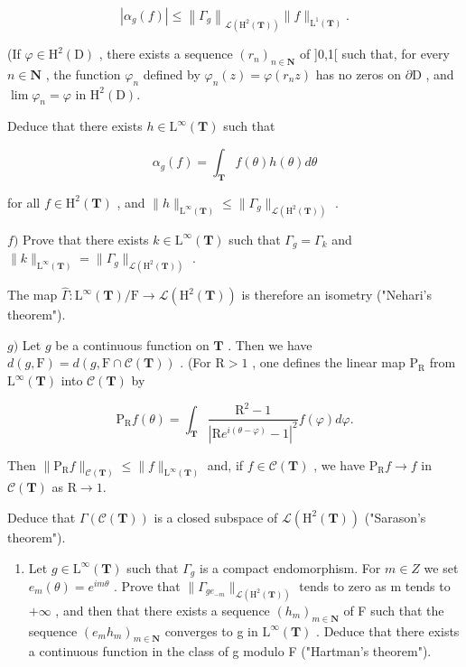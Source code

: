 \[
\left| \alpha_ {g} (f) \right| \leqslant \left\| \Gamma_ {g} \right\| _ {\mathscr {L} \left(\mathrm{H} ^ {2} (\mathbf {T})\right)} \| f \| _ {\mathrm{L} ^ {1} (\mathbf {T})}.
\]

(If \(\varphi \in \mathrm{H}^2 (\mathrm{D})\) , there exists a sequence \((r_n)_{n\in \mathbf{N}}\) of ]0,1[ such that, for every \(n\in \mathbf{N}\) , the function \(\varphi_{n}\) defined by \(\varphi_{n}(z) = \varphi (r_{n}z)\) has no zeros on \(\partial \mathrm{D}\) , and \(\lim \varphi_n = \varphi\) in \(\mathrm{H}^2 (\mathrm{D}).\)

Deduce that there exists \(h \in \mathrm{L}^{\infty}(\mathbf{T})\) such that

\[
\alpha_ {g} (f) = \int_ {\mathbf {T}} f (\theta) h (\theta) d \theta
\]

for all \(f \in \mathrm{H}^2(\mathbf{T})\) , and \(\|h\|_{\mathrm{L}^\infty(\mathbf{T})} \leqslant \| \Gamma_g \|_{\mathcal{L}(\mathrm{H}^2(\mathbf{T}))}\) .

\(f)\) Prove that there exists \(k \in \mathrm{L}^{\infty}(\mathbf{T})\) such that \(\Gamma_g = \Gamma_k\) and \(\| k \|_{\mathrm{L}^{\infty}(\mathbf{T})} = \| \Gamma_g \|_{\mathcal{L}(\mathrm{H}^2(\mathbf{T}))}\) .

The map \(\widehat{\Gamma}\colon\mathrm{L}^{\infty}(\mathbf{T})/\mathrm{F}\to\mathcal{L}(\mathrm{H}^{2}(\mathbf{T}))\) is therefore an isometry ("Nehari's theorem").

\(g)\) Let \(g\) be a continuous function on \(\mathbf{T}\) . Then we have \(d(g, \mathrm{F}) = d(g, \mathrm{F} \cap \mathcal{C}(\mathbf{T}))\) . (For \(\mathrm{R} > 1\) , one defines the linear map \(\mathrm{P}_{\mathrm{R}}\) from \(\mathrm{L}^{\infty}(\mathbf{T})\) into \(\mathcal{C}(\mathbf{T})\) by

\[
\mathrm{P} _ {\mathrm{R}} f (\theta) = \int_ {\mathbf {T}} \frac {\mathrm{R} ^ {2} - 1}{| \mathrm{R} e ^ {i (\theta - \varphi)} - 1 | ^ {2}} f (\varphi) d \varphi .
\]

Then \(\| \mathrm{P}_{\mathrm{R}}f\|_{\mathcal{C}(\mathbf{T})}\leqslant \| f\|_{\mathrm{L}^{\infty}(\mathbf{T})}\) and, if \(f\in \mathcal{C}(\mathbf{T})\) , we have \(\mathrm{P_R}f\to f\) in \(\mathcal{C}(\mathbf{T})\) as \(\mathrm{R}\rightarrow 1.\)

Deduce that \(\Gamma(\mathcal{C}(\mathbf{T}))\) is a closed subspace of \(\mathcal{L}(\mathrm{H}^{2}(\mathbf{T}))\) ("Sarason's theorem").

\begin{enumerate}
\def\labelenumi{\alph{enumi})}
\setcounter{enumi}{7}
\tightlist
\item
  Let \(g \in \mathrm{L}^{\infty}(\mathbf{T})\) such that \(\Gamma_{g}\) is a compact endomorphism. For \(m \in Z\) we set \(e_{m}(\theta) = e^{im\theta}\) . Prove that \(\|\Gamma_{ge_{-m}}\|_{\mathcal{L}(\mathrm{H}^{2}(\mathbf{T}))}\) tends to zero as m tends to \(+\infty\) , and then that there exists a sequence \((h_{m})_{m \in \mathbf{N}}\) of F such that the sequence \((e_{m}h_{m})_{m \in \mathbf{N}}\) converges to g in \(\mathrm{L}^{\infty}(\mathbf{T})\) . Deduce that there exists a continuous function in the class of g modulo F ("Hartman's theorem").
\end{enumerate}

